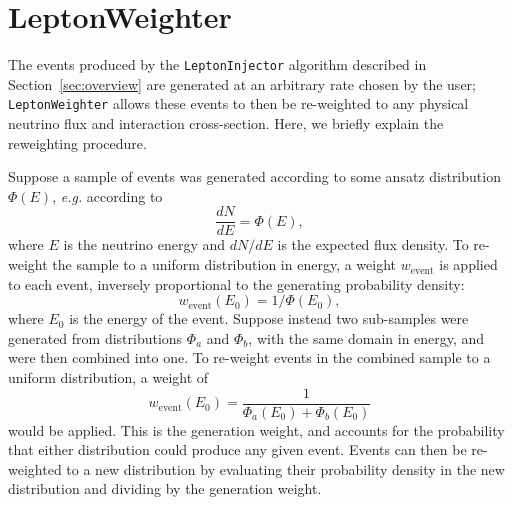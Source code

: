 \documentclass[main.tex]{subfiles}
\newcommand{\LeptonInjector}{\texttt{LeptonInjector}}
\newcommand{\LeptonWeighter}{\texttt{LeptonWeighter}}
\begin{document}
\section{LeptonWeighter\label{sec:leptonweighter}}

The events produced by the \LeptonInjector{} algorithm described in Section~\ref{sec:overview} are generated at an arbitrary rate chosen by the user; \LeptonWeighter{} allows these events to then be re-weighted to any physical neutrino flux and interaction cross-section.
Here, we briefly explain the reweighting procedure.

Suppose a sample of events was generated according to some ansatz distribution $\Phi(E)$, \textit{e.g.} according to
\begin{equation}
\frac{dN}{dE} = \Phi(E),
\end{equation}
where $E$ is the neutrino energy and $dN/dE$ is the expected flux density.
To re-weight the sample to a uniform distribution in energy, a weight $w_{\textrm{event}}$ is applied to each event, inversely proportional to the generating probability density:
\begin{equation}
w_{\textrm{event}}(E_{0}) = 1/\Phi(E_{0}),
\end{equation}
where $E_0$ is the energy of the event.
Suppose instead two sub-samples were generated from distributions $\Phi_a$ and $\Phi_b$, with the same domain in energy, and were then combined into one.
To re-weight events in the combined sample to a uniform distribution, a weight of 
\begin{equation}
w_{\textrm{event}}(E_{0}) =\dfrac{1}{ \Phi_a(E_{0}) + \Phi_b(E_{0}) }
\end{equation}
would be applied.
This is the generation weight, and accounts for the probability that either distribution could produce any given event. 
Events can then be re-weighted to a new distribution by evaluating their probability density in the new distribution and dividing by the generation weight. 
\end{document}
